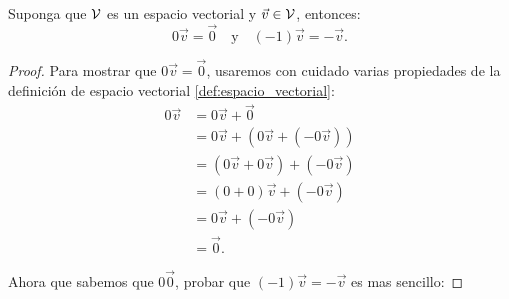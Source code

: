 \begin{theorem}
	Suponga que \(\mathcal{V}\) es un espacio vectorial y \(\vec{v} \in \mathcal{V}\), entonces:
	\[ 0 \vec{v} = \vec{0} \quad \text{y} \quad	(-1) \vec{v} = -\vec{v} .\]
\end{theorem}

\begin{proof}
	Para mostrar que \(0 \vec{v} = \vec{0}\), usaremos con cuidado varias
	propiedades de la definición de espacio vectorial 
	\ref{def:espacio_vectorial}:
	\[
	\begin{aligned}
		0 \vec{v} &= 0 \vec{v} + \vec{0} \\
			&= 0 \vec{v} + (0 \vec{v} + (- 0 \vec{v})) \\
			&= (0 \vec{v} + 0 \vec{v}) + (-0 \vec{v})\\
			&= (0 + 0) \vec{v} + (-0\vec{v}) \\
			&= 0\vec{v} + (-0\vec{v}) \\
			&= \vec{0}.
	\end{aligned}
	\]

	Ahora que sabemos que \(0 \vec{0}\), probar que \((-1)\vec{v} = -\vec{v}\)
	es mas sencillo:
\end{proof}